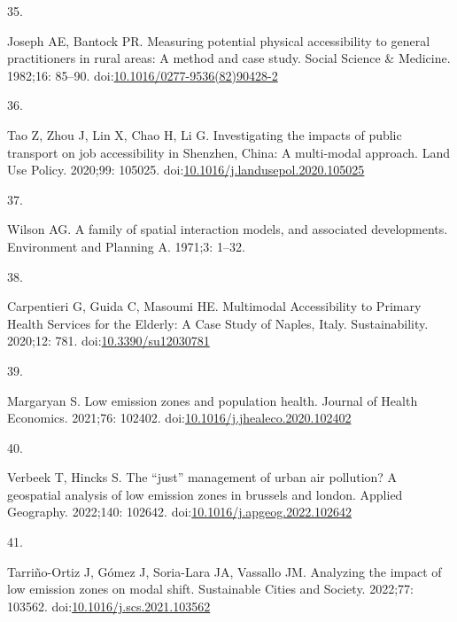 \documentclass[10pt,letterpaper]{article}
\newlength{\cslhangindent}
\newlength{\csllabelwidth}
\newlength{\cslentryspacingunit} %
\newenvironment{CSLReferences}[2] %
 {%
  \setlength{\parindent}{0pt}
  \ifodd #1
  \let\oldpar\par
  \def\par{\hangindent=\cslhangindent\oldpar}
  \fi
  \setlength{\parskip}{#2\cslentryspacingunit}
 }%
 {}
\newcommand{\CSLLeftMargin}[1]{\parbox[t]{\csllabelwidth}{#1}}
\newcommand{\CSLRightInline}[1]{\parbox[t]{\linewidth - \csllabelwidth}{#1}\break}
\begin{document}
\begin{CSLReferences}{0}{0}
\leavevmode{}%
\CSLLeftMargin{35. }%
\CSLRightInline{Joseph AE, Bantock PR. Measuring potential physical
accessibility to general practitioners in rural areas: A method and case
study. Social Science \& Medicine. 1982;16: 85--90.
doi:\href{https://doi.org/10.1016/0277-9536(82)90428-2}{10.1016/0277-9536(82)90428-2}}

\leavevmode{}%
\CSLLeftMargin{36. }%
\CSLRightInline{Tao Z, Zhou J, Lin X, Chao H, Li G. Investigating the
impacts of public transport on job accessibility in {Shenzhen}, {China}:
A multi-modal approach. Land Use Policy. 2020;99: 105025.
doi:\href{https://doi.org/10.1016/j.landusepol.2020.105025}{10.1016/j.landusepol.2020.105025}}

\leavevmode{}%
\CSLLeftMargin{37. }%
\CSLRightInline{Wilson AG. A family of spatial interaction models, and
associated developments. Environment and Planning A. 1971;3: 1--32. }

\leavevmode{}%
\CSLLeftMargin{38. }%
\CSLRightInline{Carpentieri G, Guida C, Masoumi HE. Multimodal
{Accessibility} to {Primary Health Services} for the {Elderly}: {A Case
Study} of {Naples}, {Italy}. Sustainability. 2020;12: 781.
doi:\href{https://doi.org/10.3390/su12030781}{10.3390/su12030781}}

\leavevmode{}%
\CSLLeftMargin{39. }%
\CSLRightInline{Margaryan S. Low emission zones and population health.
Journal of Health Economics. 2021;76: 102402.
doi:\href{https://doi.org/10.1016/j.jhealeco.2020.102402}{10.1016/j.jhealeco.2020.102402}}

\leavevmode{}%
\CSLLeftMargin{40. }%
\CSLRightInline{Verbeek T, Hincks S. The {``just''} management of urban
air pollution? A geospatial analysis of low emission zones in brussels
and london. Applied Geography. 2022;140: 102642.
doi:\href{https://doi.org/10.1016/j.apgeog.2022.102642}{10.1016/j.apgeog.2022.102642}}

\leavevmode{}%
\CSLLeftMargin{41. }%
\CSLRightInline{Tarriño-Ortiz J, Gómez J, Soria-Lara JA, Vassallo JM.
Analyzing the impact of low emission zones on modal shift. Sustainable
Cities and Society. 2022;77: 103562.
doi:\href{https://doi.org/10.1016/j.scs.2021.103562}{10.1016/j.scs.2021.103562}}


\end{CSLReferences}
\end{document}
